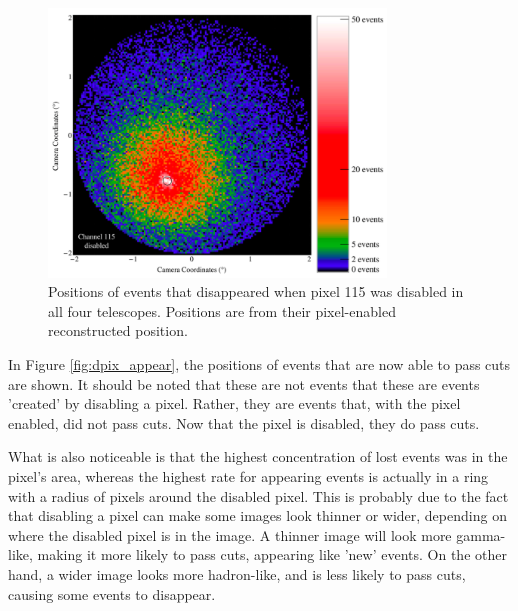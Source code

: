     \begin{figure}[ht]
      \centering
      \includegraphics[width=0.8\textwidth]{images/disabled_pixel/disappearing_events}
      \caption[Disappearing Events]{
        Positions of events that disappeared when pixel 115 was disabled in all four telescopes.
        Positions are from their pixel-enabled reconstructed position.
      }
      \label{fig:dpix_disappear}
    \end{figure}

    In Figure \ref{fig:dpix_appear}, the positions of events that are now able to pass cuts are shown.
    It should be noted that these are not events that these are events 'created' by disabling a pixel.
    Rather, they are events that, with the pixel enabled, did not pass cuts.
    Now that the pixel is disabled, they do pass cuts.

    What is also noticeable is that the highest concentration of lost events was in the pixel's area, whereas the highest rate for appearing events is actually in a ring with a radius of  pixels around the disabled pixel.
    This is probably due to the fact that disabling a pixel can make some images look thinner or wider, depending on where the disabled pixel is in the image.
    A thinner image will look more gamma-like, making it more likely to pass cuts, appearing like 'new' events.
    On the other hand, a wider image looks more hadron-like, and is less likely to pass cuts, causing some events to disappear.

